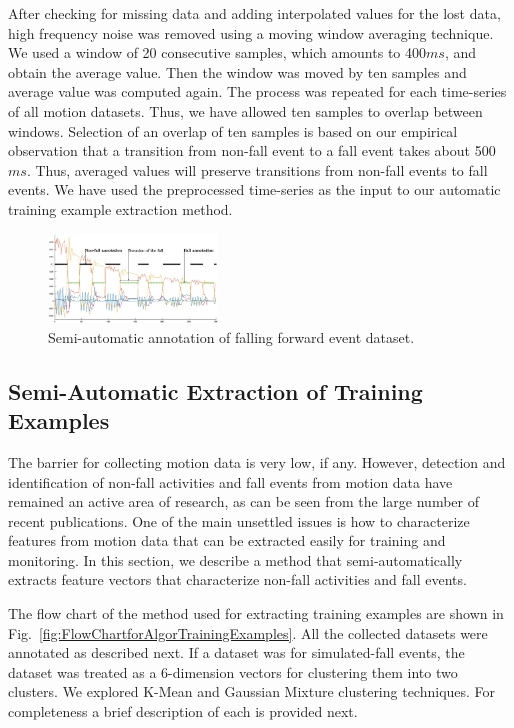 \documentclass[]{IEEEtran}
\begin{document}
After checking for missing data and adding interpolated values for the lost
data,  high frequency noise was removed using a moving window averaging
technique. We used a window  of 20 consecutive samples, which amounts to
400$ms$, and obtain the average value. Then the  window was moved by ten
samples and average  value was computed again. The process was repeated for
each time-series of all motion datasets. Thus, we have allowed ten samples to
overlap between windows.  Selection of an overlap of ten samples is based on
our empirical observation that a transition from non-fall event to a fall event
takes about 500$ms$. Thus, averaged values will preserve transitions from
non-fall events to fall events.   We have used the preprocessed time-series as
the input to our automatic training example extraction method.

\begin{figure}[b]
\centering
\includegraphics[width=0.4\textwidth]{plots/human_falling_forward2.eps} 
\caption{Semi-automatic annotation of falling forward event dataset.}
 \label{fig:automatic_annotation} 
\end{figure}

\subsection{Semi-Automatic  Extraction of Training Examples}

The barrier for collecting motion data is very low, if any. However, detection
and identification of non-fall activities and fall events from motion data have
remained an active area of research, as can be seen from the large number of
recent publications. One of the main unsettled issues is how to characterize
features from motion data that can be extracted easily for training and
monitoring. In this section, we describe a method that semi-automatically
extracts feature vectors that characterize non-fall activities and fall events.

The flow chart of the method used for extracting training examples are shown in
Fig.~\ref{fig:FlowChartforAlgorTrainingExamples}. All the collected datasets
were annotated as described next. If a dataset was for simulated-fall events,
the dataset was treated as a 6-dimension vectors for clustering them into two
clusters. We explored K-Mean and Gaussian Mixture clustering techniques. For
completeness a brief description of each is provided next.
\end{document}
